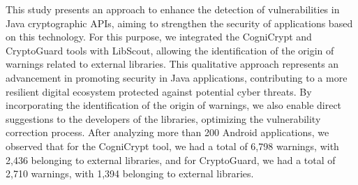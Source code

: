 This study presents an approach to enhance the detection of vulnerabilities in Java cryptographic APIs,
aiming to strengthen the security of applications based on this technology. For this purpose,
we integrated the CogniCrypt and CryptoGuard tools with LibScout, allowing the identification
of the origin of warnings related to external libraries. This qualitative approach represents
an advancement in promoting security in Java applications, contributing to a more resilient
digital ecosystem protected against potential cyber threats. By incorporating the identification
of the origin of warnings, we also enable direct suggestions to the developers of the libraries,
optimizing the vulnerability correction process. After analyzing more than 200 Android applications,
we observed that for the CogniCrypt tool, we had a total of 6,798 warnings, with 2,436 belonging
to external libraries, and for CryptoGuard, we had a total of 2,710 warnings, with 1,394
belonging to external libraries.